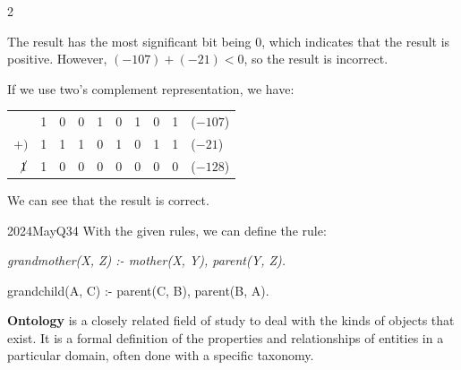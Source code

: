 \begin{multicols}{2}
\begin{solution}
    The result has the most significant bit being 0, which indicates that the result is positive.
    However, $(-107)+(-21)<0$, so the result is incorrect.

    If we use two's complement representation, we have:
    \begin{center}
        \begin{tabular}{rccccccccl}
                             & 1 & 0 & 0 & 1 & 0 & 1 & 0 & 1 & ($-107$)\\
            $+)$             & 1 & 1 & 1 & 0 & 1 & 0 & 1 & 1 & ($-21$)\\\hline
                $\cancel{1}$ & 1 & 0 & 0 & 0 & 0 & 0 & 0 & 0 & ($-128$)\\
        \end{tabular}
    \end{center}
    We can see that the result is correct.
\end{solution}

\columnbreak

\begin{qsolution}{2024}{May}{Q34}{\tgCE \tgCELogicProgramming}
    With the given rules, we can define the rule:

    {\itshape
        grandmother(X, Z) :- mother(X, Y), parent(Y, Z).

        grandchild(A, C) :- parent(C, B), parent(B, A).
    }

    \textbf{Ontology} is a closely related field of study to deal with the kinds of objects that exist.
    It is a formal definition of the properties and relationships of entities in a particular domain, often done with a specific taxonomy.
\end{qsolution}

\end{multicols}


